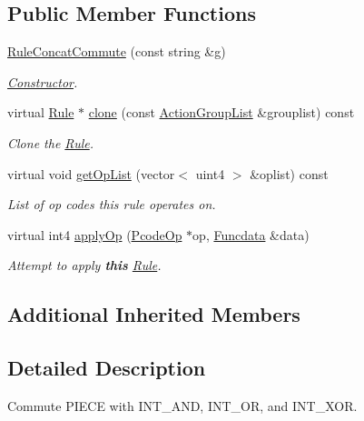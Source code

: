 \subsection*{Public Member Functions}
\begin{DoxyCompactItemize}
\item 
\mbox{\hyperlink{class_rule_concat_commute_a893eef10fd7ac5f9d49580159d2e67e3}{Rule\+Concat\+Commute}} (const string \&g)
\begin{DoxyCompactList}\small\item\em \mbox{\hyperlink{class_constructor}{Constructor}}. \end{DoxyCompactList}\item 
virtual \mbox{\hyperlink{class_rule}{Rule}} $\ast$ \mbox{\hyperlink{class_rule_concat_commute_ac1f7bc3a2249397cd9a5d2a1cfb8b0db}{clone}} (const \mbox{\hyperlink{class_action_group_list}{Action\+Group\+List}} \&grouplist) const
\begin{DoxyCompactList}\small\item\em Clone the \mbox{\hyperlink{class_rule}{Rule}}. \end{DoxyCompactList}\item 
virtual void \mbox{\hyperlink{class_rule_concat_commute_a5c3b84b40f77aec4e51ee59b5911474f}{get\+Op\+List}} (vector$<$ uint4 $>$ \&oplist) const
\begin{DoxyCompactList}\small\item\em List of op codes this rule operates on. \end{DoxyCompactList}\item 
virtual int4 \mbox{\hyperlink{class_rule_concat_commute_a75dbdeccddc5baf27b6390449b331bcf}{apply\+Op}} (\mbox{\hyperlink{class_pcode_op}{Pcode\+Op}} $\ast$op, \mbox{\hyperlink{class_funcdata}{Funcdata}} \&data)
\begin{DoxyCompactList}\small\item\em Attempt to apply {\bfseries{this}} \mbox{\hyperlink{class_rule}{Rule}}. \end{DoxyCompactList}\end{DoxyCompactItemize}
\subsection*{Additional Inherited Members}


\subsection{Detailed Description}
Commute P\+I\+E\+CE with I\+N\+T\+\_\+\+A\+ND, I\+N\+T\+\_\+\+OR, and I\+N\+T\+\_\+\+X\+OR. 

